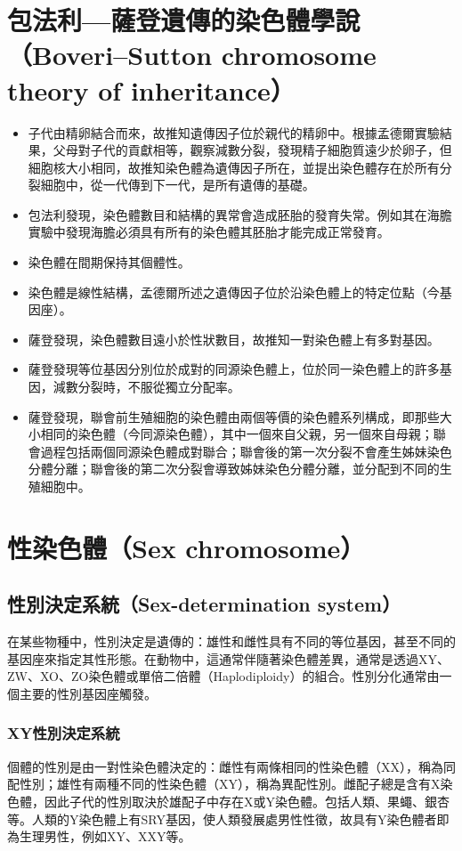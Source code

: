 \documentclass[a4paper,12pt]{report}
\begin{document}
\section{包法利—薩登遺傳的染色體學說（Boveri–Sutton chromosome theory of inheritance）}
\begin{itemize}
\item 子代由精卵結合而來，故推知遺傳因子位於親代的精卵中。根據孟德爾實驗結果，父母對子代的貢獻相等，觀察減數分裂，發現精子細胞質遠少於卵子，但細胞核大小相同，故推知染色體為遺傳因子所在，並提出染色體存在於所有分裂細胞中，從一代傳到下一代，是所有遺傳的基礎。
\item 包法利發現，染色體數目和結構的異常會造成胚胎的發育失常。例如其在海膽實驗中發現海膽必須具有所有的染色體其胚胎才能完成正常發育。
\item 染色體在間期保持其個體性。
\item 染色體是線性結構，孟德爾所述之遺傳因子位於沿染色體上的特定位點（今基因座）。
\item 薩登發現，染色體數目遠小於性狀數目，故推知一對染色體上有多對基因。
\item 薩登發現等位基因分別位於成對的同源染色體上，位於同一染色體上的許多基因，減數分裂時，不服從獨立分配率。
\item 薩登發現，聯會前生殖細胞的染色體由兩個等價的染色體系列構成，即那些大小相同的染色體（今同源染色體），其中一個來自父親，另一個來自母親；聯會過程包括兩個同源染色體成對聯合；聯會後的第一次分裂不會產生姊妹染色分體分離；聯會後的第二次分裂會導致姊妹染色分體分離，並分配到不同的生殖細胞中。
\end{itemize}
\section{性染色體（Sex chromosome）}
\subsection{性別決定系統（Sex-determination system）}
在某些物種中，性別決定是遺傳的：雄性和雌性具有不同的等位基因，甚至不同的基因座來指定其性形態。在動物中，這通常伴隨著染色體差異，通常是透過XY、ZW、XO、ZO染色體或單倍二倍體（Haplodiploidy）的組合。性別分化通常由一個主要的性別基因座觸發。
\subsubsection{XY性別決定系統}
個體的性別是由一對性染色體決定的：雌性有兩條相同的性染色體（XX），稱為同配性別；雄性有兩種不同的性染色體（XY），稱為異配性別。雌配子總是含有X染色體，因此子代的性別取決於雄配子中存在X或Y染色體。包括人類、果蠅、銀杏等。人類的Y染色體上有SRY基因，使人類發展處男性性徵，故具有Y染色體者即為生理男性，例如XY、XXY等。
\end{document}

